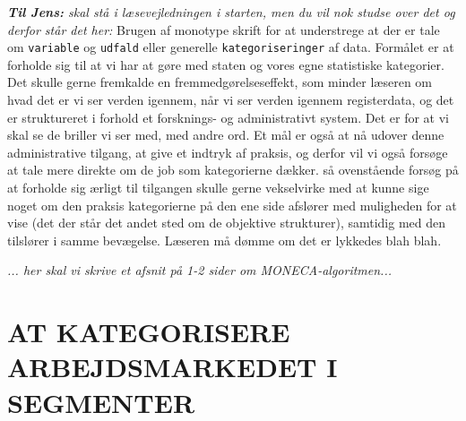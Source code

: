 \emph{\textbf{Til Jens:} skal stå i læsevejledningen i starten, men du vil nok studse over det og derfor står det her: }
Brugen af monotype skrift for at understrege at der er tale om \texttt{variable} og \texttt{udfald} eller generelle \texttt{kategoriseringer} af data. Formålet er at forholde sig til at vi har at gøre med staten og vores egne statistiske kategorier. Det skulle gerne fremkalde en fremmedgørelseseffekt, som minder læseren om hvad det er vi ser verden igennem, når vi ser verden igennem registerdata, og det er struktureret i forhold et forsknings- og administrativt system. Det er for at vi skal se de briller vi ser med, med andre ord. Et mål er også at nå udover denne administrative tilgang, at give et indtryk af praksis, og derfor vil vi også forsøge at tale mere direkte om de job som kategorierne dækker. så ovenstående forsøg på at forholde sig ærligt til tilgangen skulle gerne vekselvirke med at kunne sige noget om den praksis kategorierne på den ene side afslører med muligheden for at vise (det der står det andet sted om de objektive strukturer), samtidig med den tilslører i samme bevægelse. Læseren må dømme om det er lykkedes blah blah.

\emph{... her skal vi skrive et afsnit på 1-2 sider om MONECA-algoritmen...} %







\section{AT KATEGORISERE ARBEJDSMARKEDET I SEGMENTER \label{disco}}

